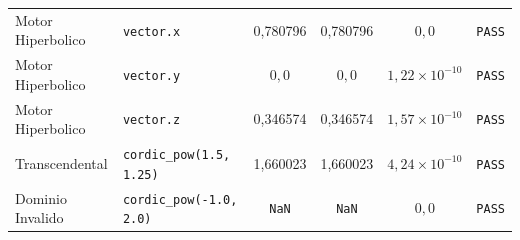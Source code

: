 \begin{table}[htbp]
{\begin{tabular}{llcccc}
Motor Hiperbolico & \texttt{vector.x} & 0,780796 & 0,780796 & $0{,}0$ & \texttt{PASS} \\
Motor Hiperbolico & \texttt{vector.y} & $0{,}0$ & $0{,}0$ & $1,22 \times 10^{-10}$ & \texttt{PASS} \\
Motor Hiperbolico & \texttt{vector.z} & 0,346574 & 0,346574 & $1,57 \times 10^{-10}$ & \texttt{PASS} \\
Transcendental & \texttt{cordic\_pow(1.5, 1.25)} & 1,660023 & 1,660023 & $4,24 \times 10^{-10}$ & \texttt{PASS} \\
Dominio Invalido & \texttt{cordic\_pow(-1.0, 2.0)} & \texttt{NaN} & \texttt{NaN} & $0{,}0$ & \texttt{PASS} \\
\hline
\end{tabular}%
}
\end{table}